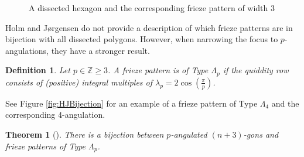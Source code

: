 \documentclass[12pt]{article}
\newtheorem{definition}{Definition}
\newtheorem{theorem}{Theorem}
\theoremstyle{remark}
\newcommand*{\Jor}{J{\o}rgensen }
\newcommand*{\Z}{\mathbb{Z}}
\begin{document}
\begin{figure}
    \centering
    \caption{A dissected hexagon and the corresponding frieze pattern of width 3}
    \label{fig:HJInjection}
\end{figure}

 Holm and \Jor do not provide a description of which frieze patterns are in bijection with all dissected polygons. However, when narrowing the focus to $p$-angulations, they have a stronger result.

\begin{definition}
Let $p\in \Z \geq 3$. A frieze pattern is of \emph{Type $\Lambda_p$} if the quiddity row consists of
(positive) integral multiples of $\lambda_p = 2\cos(\frac{\pi}{p})$.
\end{definition}

See Figure \ref{fig:HJBijection} for an example of a frieze pattern of Type $\Lambda_4$ and the corresponding 4-angulation. 

\begin{theorem}[\cite{14}]
There is a bijection between $p$-angulated $(n+3)$-gons and frieze patterns of Type $\Lambda_p$.
\end{theorem}
\end{document}
